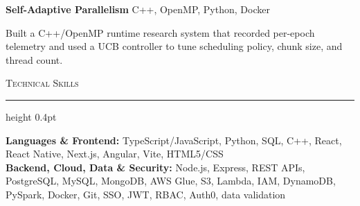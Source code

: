 \documentclass[letterpaper,11pt]{article}
\newcommand{\resumesection}[1]{%
  \par\vspace{2pt}%
  {\large\scshape #1}\par\vspace{2pt}%
  \hrule height 0.4pt\vspace{2pt}%
}
\newcommand{\projectHeading}[2]{
  \textbf{#1} \hfill #2
}
\begin{document}
\projectHeading{Self-Adaptive Parallelism}{C++, OpenMP, Python, Docker}
\begin{tightitemize}
  \item Built a C++/OpenMP runtime research system that recorded per-epoch telemetry and used a UCB controller to tune scheduling policy, chunk size, and thread count.
\end{tightitemize}

\resumesection{Technical Skills}
\textbf{Languages \& Frontend:} TypeScript/JavaScript, Python, SQL, C++, React, React Native, Next.js, Angular, Vite, HTML5/CSS\\
\textbf{Backend, Cloud, Data \& Security:} Node.js, Express, REST APIs, PostgreSQL, MySQL, MongoDB, AWS Glue, S3, Lambda, IAM, DynamoDB, PySpark, Docker, Git, SSO, JWT, RBAC, Auth0, data validation
\end{document}
